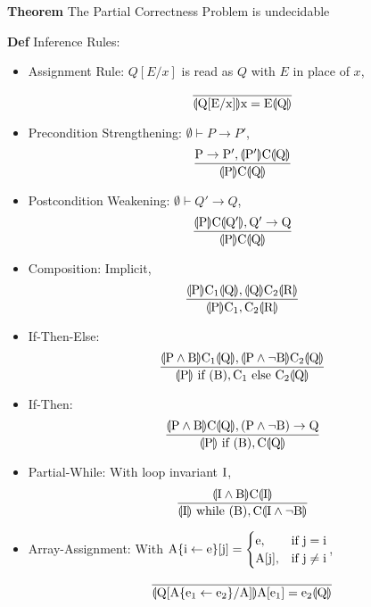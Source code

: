 \documentclass[11pt,notitlepage]{report}
\newcommand{\llp}[0]{\ensuremath{\llparenthesis}}
\newcommand{\rrp}[0]{\ensuremath{\rrparenthesis}}
\newcommand{\tbf}[1]{\textbf{#1}}
\begin{document}
\tbf{Theorem} The Partial Correctness Problem is undecidable

\newpage
\tbf{Def} Inference Rules: 
\vspace{-3mm}
\begin{itemize}
    \item Assignment Rule: $Q[E/x]$ is read as $Q$ with $E$ in place of $x$,
    $$\rm \frac{}{\llp Q[E/x] \rrp x = E \llp Q \rrp}$$
    \item Precondition Strengthening: $\emptyset \vdash P \to P'$,
    $$\rm \frac{P \to P', \llp P'\rrp C \llp Q \rrp}{\llp P \rrp C \llp Q \rrp}$$
    \item Postcondition Weakening: $\emptyset \vdash Q' \to Q$,
    $$\rm \frac{\llp P\rrp C \llp Q' \rrp, Q' \to Q}{\llp P \rrp C \llp Q \rrp}$$
    \item Composition: Implicit,
    $$\rm \frac{\llp P\rrp C_1 \llp Q \rrp, \llp Q\rrp C_2 \llp R \rrp}{\llp P \rrp C_1, C_2 \llp R \rrp}$$
    \item If-Then-Else:
    $$\rm \frac{\llp P \wedge B\rrp C_1 \llp Q \rrp, \llp P \wedge \neg B\rrp C_2 \llp Q \rrp}{\llp P \rrp \text{ if } (B), C_1 \text{ else } C_2 \llp Q \rrp}$$
    \item If-Then:
    $$\rm \frac{\llp P \wedge B\rrp C \llp Q \rrp, (P \wedge \neg B) \to Q}{\llp P \rrp \text{ if } (B), C \llp Q \rrp}$$
    \item Partial-While: With loop invariant $\rm I$,
    $$\rm \frac{\llp I \wedge B\rrp C \llp I \rrp}{\llp I \rrp \text{ while } (B), C \llp I \wedge \neg B \rrp}$$
    \item Array-Assignment: With $\rm A\{i \leftarrow e\}[j]  =\begin{cases}\rm e, &\text{if }\rm j=i\\\rm A[j], &\text{if }\rm j\ne i\end{cases}$,
    $$\rm \frac{}{\llp Q[A\{e_1 \leftarrow e_2\}/A] \rrp A[e_1] = e_2 \llp Q \rrp}$$
\end{itemize}
\end{document}
